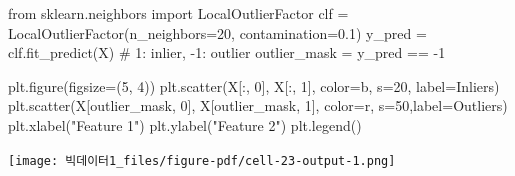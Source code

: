 \documentclass[
  a4paper,
  DIV=11,
  numbers=noendperiod]{scrreprt}
\newenvironment{Shaded}{\begin{snugshade}}{\end{snugshade}}
\newcommand{\CommentTok}[1]{\textcolor[rgb]{0.37,0.37,0.37}{#1}}
\newcommand{\DecValTok}[1]{\textcolor[rgb]{0.68,0.00,0.00}{#1}}
\newcommand{\FloatTok}[1]{\textcolor[rgb]{0.68,0.00,0.00}{#1}}
\newcommand{\ImportTok}[1]{\textcolor[rgb]{0.00,0.46,0.62}{#1}}
\newcommand{\NormalTok}[1]{\textcolor[rgb]{0.00,0.23,0.31}{#1}}
\newcommand{\OperatorTok}[1]{\textcolor[rgb]{0.37,0.37,0.37}{#1}}
\newcommand{\StringTok}[1]{\textcolor[rgb]{0.13,0.47,0.30}{#1}}
\begin{document}
\begin{Shaded}
\begin{Highlighting}[]
\ImportTok{from}\NormalTok{ sklearn.neighbors }\ImportTok{import}\NormalTok{ LocalOutlierFactor}
\NormalTok{clf }\OperatorTok{=}\NormalTok{ LocalOutlierFactor(n\_neighbors}\OperatorTok{=}\DecValTok{20}\NormalTok{, contamination}\OperatorTok{=}\FloatTok{0.1}\NormalTok{)}
\NormalTok{y\_pred }\OperatorTok{=}\NormalTok{ clf.fit\_predict(X) }\CommentTok{\# 1: inlier, {-}1: outlier}
\NormalTok{outlier\_mask }\OperatorTok{=}\NormalTok{ y\_pred }\OperatorTok{==} \OperatorTok{{-}}\DecValTok{1}

\NormalTok{plt.figure(figsize}\OperatorTok{=}\NormalTok{(}\DecValTok{5}\NormalTok{, }\DecValTok{4}\NormalTok{))}
\NormalTok{plt.scatter(X[:, }\DecValTok{0}\NormalTok{], X[:, }\DecValTok{1}\NormalTok{], color}\OperatorTok{=}\StringTok{\textquotesingle{}b\textquotesingle{}}\NormalTok{, s}\OperatorTok{=}\DecValTok{20}\NormalTok{, label}\OperatorTok{=}\StringTok{\textquotesingle{}Inliers\textquotesingle{}}\NormalTok{)}
\NormalTok{plt.scatter(X[outlier\_mask, }\DecValTok{0}\NormalTok{], X[outlier\_mask, }\DecValTok{1}\NormalTok{], color}\OperatorTok{=}\StringTok{\textquotesingle{}r\textquotesingle{}}\NormalTok{, s}\OperatorTok{=}\DecValTok{50}\NormalTok{,label}\OperatorTok{=}\StringTok{\textquotesingle{}Outliers\textquotesingle{}}\NormalTok{)}
\NormalTok{plt.xlabel(}\StringTok{"Feature 1"}\NormalTok{)}
\NormalTok{plt.ylabel(}\StringTok{"Feature 2"}\NormalTok{)}
\NormalTok{plt.legend()}
\end{Highlighting}
\end{Shaded}

\texttt{[image: 빅데이터1\_files/figure-pdf/cell-23-output-1.png]}
\end{document}
